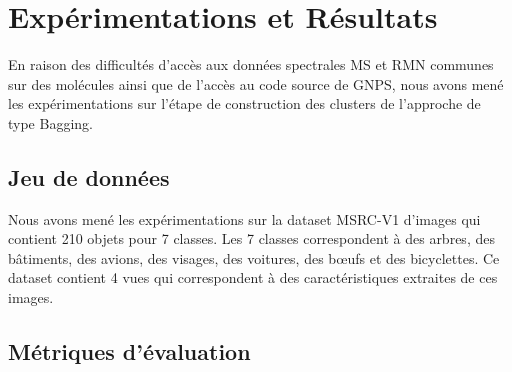\clearpage

\section{Expérimentations et Résultats}

En raison des difficultés d'accès aux données spectrales \acrshort{MS} et \acrshort{RMN} communes sur des molécules ainsi que de l'accès au code source de GNPS, nous avons mené les expérimentations sur l'étape de construction des clusters de l'approche de type Bagging.

\subsection{Jeu de données}

    Nous avons mené les expérimentations sur la dataset MSRC-V1 d'images qui contient 210 objets pour 7 classes.
    Les 7 classes correspondent à des arbres, des bâtiments, des avions, des visages, des voitures, des bœufs et des bicyclettes.
    Ce dataset contient 4 vues qui correspondent à des caractéristiques extraites de ces images.

\subsection{Métriques d'évaluation}

